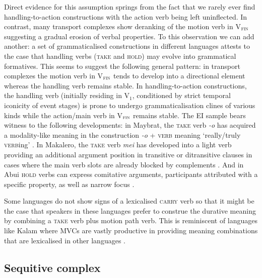 Direct evidence for this assumption springs from the fact that we rarely ever find handling-to-action constructions with the action verb being left uninflected. In contrast, many transport complexes show deranking of the motion verb in V$_{\textsc{fin}}$ suggesting a gradual erosion of verbal properties. To this observation we can add another: a set of grammaticalised constructions in different languages attests to the case that handling verbs (\textsc{take} and \textsc{hold)} may evolve into grammatical formatives. This seems to suggest the following general pattern: in transport complexes the motion verb in V$_{\textsc{fin}}$ tends to develop into a directional element whereas the handling verb remains stable. In handling-to-action constructions, the handling verb (initially residing in V$_{1}$, conditioned by strict temporal iconicity of event stages) is prone to undergo grammaticalisation clines of various kinds while the action/main verb in V$_{\textsc{fin}}$ remains stable. The EI sample bears witness to the following developments: in Maybrat, the \textsc{take} verb \textit{-o} has acquired a modality-like meaning in the construction \textit{-o} + \textsc{verb} meaning `really/truly \textsc{verb}ing' \citep[195]{dol2007grammar}. In Makalero, the \textsc{take} verb \textit{mei} has developed into a light verb providing an additional argument position in transitive or ditransitive clauses in cases where the main verb slots are already blocked by complements \citep[203]{huber2011}. And in Abui \textsc{hold} verbs can express comitative arguments, participants attributed with a specific property, as well as narrow focus \citep[382--7]{kratochvil2007grammar}.

Some languages do not show signs of a lexicalised \textsc{carry} verb so that it might be the case that speakers in these languages prefer to construe the durative meaning by combining a \textsc{take} verb plus motion path verb. This is reminiscent of languages like Kalam where MVCs are vastly productive in providing meaning combinations that are lexicalised in other languages \citep{pawley2011event}. 

\subsection{Sequitive complex} \label{sec:sequitive}

